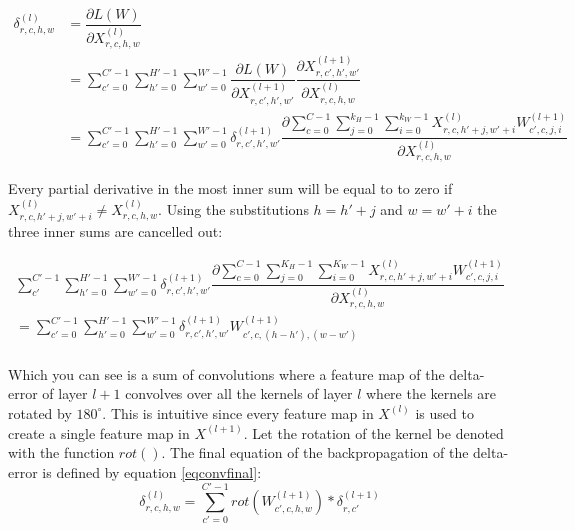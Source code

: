 \documentclass[a4paper,11pt,twoside]{article}
\newcommand*{\pd}[2]{\ensuremath{\dfrac{\partial #1}{\partial #2}}}
\begin{document}
\begin{equation}\label{konvolutionbackprop}
\begin{split}
	\delta^{(l)}_{r,c,h,w}
		& = \pd{L(W)}{X^{(l)}_{r,c,h,w}} \\
		& = \sum^{C'-1}_{c'=0} \sum^{H'-1}_{h'=0} \sum^{W'-1}_{w'=0} \pd{L(W)}{X^{(l+1)}_{r,c',h',w'}} \pd{X^{(l+1)}_{r,c',h',w'}}{X^{(l)}_{r,c,h,w}} \\
		& = \sum^{C'-1}_{c'=0} \sum^{H'-1}_{h'=0} \sum^{W'-1}_{w'=0} \delta^{(l+1)}_{r,c',h',w'} \pd{\sum^{C-1}_{c=0} \sum^{k_H-1}_{j=0} \sum^{k_W-1}_{i=0} X^{(l)}_{r, c, h'+j, w'+i}W^{(l+1)}_{c', c, j, i}}{X^{(l)}_{r,c,h,w}}
\end{split}
\end{equation}

Every partial derivative in the most inner sum will be equal to to zero if $X^{(l)}_{r, c, h'+j, w'+i} \neq X^{(l)}_{r,c,h,w}$. Using the substitutions $h = h'+j$ and $w = w'+i$ the three inner sums are cancelled out: \cite{webconv1} \cite{webconv2} \cite{webconv3}

\begin{multline}
\sum^{C'-1}_{c'} \sum^{H'-1}_{h'=0} \sum^{W'-1}_{w'=0} \delta^{(l+1)}_{r,c',h',w'} \pd{\sum^{C-1}_{c=0} \sum^{K_H-1}_{j=0} \sum^{K_W-1}_{i=0} X^{(l)}_{r, c, h'+j, w'+i}W^{(l+1)}_{c', c, j, i}}{X^{(l)}_{r,c,h,w}} \\
	 = \sum^{C'-1}_{c'=0} \sum^{H'-1}_{h'=0} \sum^{W'-1}_{w'=0} \delta^{(l+1)}_{r,c',h',w'} W^{(l+1)}_{c', c, (h-h'), (w-w')}     \\
\end{multline}

Which you can see is a sum of convolutions where a feature map of the delta-error of layer $l+1$ convolves over all the kernels of layer $l$ where the kernels are rotated by $180^\circ$. This is intuitive since every feature map in $X^{(l)}$ is used to create a single feature map in $X^{(l+1)}$. Let the rotation of the kernel be denoted with the function $rot()$. The final equation of the backpropagation of the delta-error is defined by equation \eqref{eqconvfinal}: \cite{webconv1} \cite{webconv2} \cite{webconv3}
\begin{equation}\label{eqconvfinal}
\delta^{(l)}_{r,c,h,w} = \sum^{C'-1}_{c'=0} rot(W^{(l+1)}_{c',c,h,w}) * \delta^{(l+1)}_{r,c'}
\end{equation}
\end{document}
